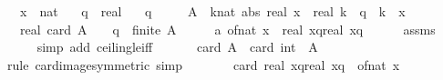 \begin{isabellebody}
\ \ \ x\ {\isacharcolon}{\kern0pt}{\isacharcolon}{\kern0pt}\ nat\isanewline
\ \ \ q\ {\isacharcolon}{\kern0pt}{\isacharcolon}{\kern0pt}\ real\isanewline
\ \ \ {\isachardoublequoteopen}q\ {\isasymge}\ {}{\isachardoublequoteclose}\isanewline
\ \ \ {\isachardoublequoteopen}A\ {\isasymequiv}\ {\isacharbraceleft}{\kern0pt}{\isacharparenleft}{\kern0pt}k{\isacharcolon}{\kern0pt}{\isacharcolon}{\kern0pt}nat{\isacharparenright}{\kern0pt}{\isachardot}{\kern0pt}\ abs\ {\isacharparenleft}{\kern0pt}real\ x\ {\isacharminus}{\kern0pt}\ real\ k{\isacharparenright}{\kern0pt}\ {\isasymle}\ q\ {\isasymand}\ k\ {\isasymnoteq}\ x{\isacharbraceright}{\kern0pt}{\isachardoublequoteclose}\isanewline
\ \ \ {\isachardoublequoteopen}real\ {\isacharparenleft}{\kern0pt}card\ A{\isacharparenright}{\kern0pt}\ {\isasymle}\ {}\ {\isacharasterisk}{\kern0pt}\ q{\isachardoublequoteclose}\ \ {\isachardoublequoteopen}finite\ A{\isachardoublequoteclose}\isanewline
%
\isadelimproof
%
\endisadelimproof
%
\isatagproof
{}\isamarkupfalse%
\ {\isacharminus}{\kern0pt}\isanewline
\ \ \isamarkupfalse%
\ a{\isacharcolon}{\kern0pt}\ {\isachardoublequoteopen}of{\isacharunderscore}{\kern0pt}nat\ x\ {\isasymin}\ {\isacharbraceleft}{\kern0pt}{\isasymlceil}real\ x{\isacharminus}{\kern0pt}q{\isasymrceil}{\isachardot}{\kern0pt}{\isachardot}{\kern0pt}{\isasymlfloor}real\ x{\isacharplus}{\kern0pt}q{\isasymrfloor}{\isacharbraceright}{\kern0pt}{\isachardoublequoteclose}\isanewline
\ \ \ \ \isamarkupfalse%
\ assms\ \isanewline
\ \ \ \ \isamarkupfalse%
\ {\isacharparenleft}{\kern0pt}simp\ add{\isacharcolon}{\kern0pt}\ ceiling{\isacharunderscore}{\kern0pt}le{\isacharunderscore}{\kern0pt}iff{\isacharparenright}{\kern0pt}\isanewline
\ \ \isanewline
\ \ \isamarkupfalse%
\ {\isachardoublequoteopen}card\ A\ {\isacharequal}{\kern0pt}\ card\ {\isacharparenleft}{\kern0pt}int\ {\isacharbackquote}{\kern0pt}\ A{\isacharparenright}{\kern0pt}{\isachardoublequoteclose}\isanewline
\ \ \ \ \isamarkupfalse%
\ {\isacharparenleft}{\kern0pt}rule\ card{\isacharunderscore}{\kern0pt}image{\isacharbrackleft}{\kern0pt}symmetric{\isacharbrackright}{\kern0pt}{\isacharcomma}{\kern0pt}\ simp{\isacharparenright}{\kern0pt}\isanewline
\ \ \isamarkupfalse%
\ \isamarkupfalse%
\ {\isachardoublequoteopen}{\isachardot}{\kern0pt}{\isachardot}{\kern0pt}{\isachardot}{\kern0pt}\ {\isasymle}\ card\ {\isacharparenleft}{\kern0pt}{\isacharbraceleft}{\kern0pt}{\isasymlceil}real\ x{\isacharminus}{\kern0pt}q{\isasymrceil}{\isachardot}{\kern0pt}{\isachardot}{\kern0pt}{\isasymlfloor}real\ x{\isacharplus}{\kern0pt}q{\isasymrfloor}{\isacharbraceright}{\kern0pt}\ {\isacharminus}{\kern0pt}\ {\isacharbraceleft}{\kern0pt}of{\isacharunderscore}{\kern0pt}nat\ x{\isacharbraceright}{\kern0pt}{\isacharparenright}{\kern0pt}{\isachardoublequoteclose}\isanewline

\end{isabellebody}

